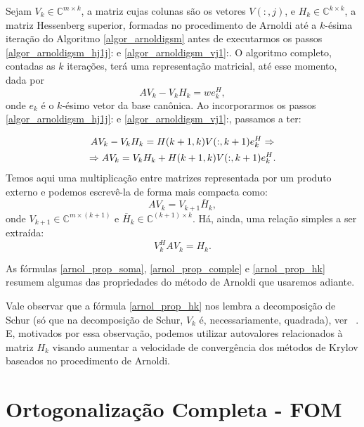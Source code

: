 Sejam $V_k\in\mathbb{C}^{m\times k}$, a matriz cujas colunas são  os vetores $V(:,j)$, e $H_k\in\mathbb{C}^{k\times k}$, a matriz Hessenberg superior, formadas no procedimento de Arnoldi  até  a $k$-ésima iteração do Algoritmo \ref{algor_arnoldigsm} antes de executarmos os passos \ref{algor_arnoldigsm_hj1j}: e \ref{algor_arnoldigsm_vj1}:. O algoritmo completo, contadas as $k$ iterações, terá uma representação matricial,  até  esse momento, dada por
\begin{equation}\label{arnol_prop_avk-vkhwekh}
AV_k-V_kH_k=we_k^H,
\end{equation}
onde $e_k$ é o $k$-ésimo vetor da base canônica. Ao incorporarmos os passos  \ref{algor_arnoldigsm_hj1j}: e \ref{algor_arnoldigsm_vj1}:, passamos a ter:

\begin{gather}
AV_k-V_kH_k=H(k+1,k)V(:,k+1)e_k^H \Rightarrow \notag\\ \Rightarrow AV_k=V_kH_k+H(k+1,k)V(:,k+1)e_k^H\label{arnol_prop_soma}.
\end{gather}
Temos aqui uma multiplicação entre matrizes representada por um produto externo e podemos escrevê-la de forma mais compacta como:
\begin{equation}\label{arnol_prop_comple}
AV_k=V_{k+1}\overline{H}_k,
\end{equation}
onde $V_{k+1}\in\mathbb{C}^{m\times (k+1)}$ e $\overline{H}_k\in\mathbb{C}^{(k+1)\times k}$.
Há, ainda, uma relação simples a ser extraída:
\begin{equation}\label{arnol_prop_hk}
V_k^HAV_k={H}_k.
\end{equation}



 As fórmulas \eqref{arnol_prop_soma}, \eqref{arnol_prop_comple} e \eqref{arnol_prop_hk} resumem algumas das propriedades do método de Arnoldi que usaremos adiante.

 \begin{obs}\label{arnol_obs_vkavk}
 Vale observar que a fórmula \eqref{arnol_prop_hk} nos lembra  a decomposição de Schur (só que na decomposição de Schur, $V_k$ é, necessariamente, quadrada), ver ~\cite[pág. 79]{HornJohnson1985}. E, motivados por essa observação, podemos utilizar autovalores relacionados à matriz ${H}_k$ visando aumentar a velocidade de convergência dos  métodos de Krylov baseados no procedimento de Arnoldi.
 \end{obs}

\section{Ortogonalização Completa - FOM}\label{arnol_sec_fom}

